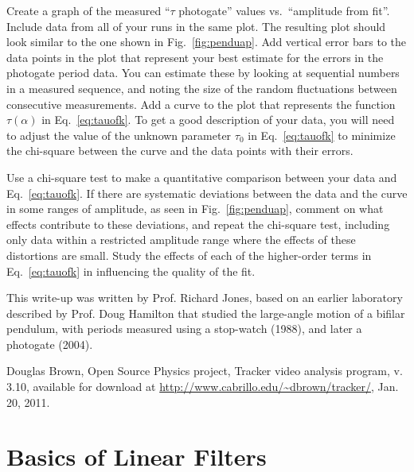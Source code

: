 \documentclass{revtex4}
\begin{document}
Create a graph of the measured ``$\tau$ photogate'' values vs.\ 
``amplitude from fit''.  Include data from all of your runs in the same
plot.  The resulting plot should look similar to the one shown in
Fig.~\ref{fig:penduap}.  Add vertical error bars to the data points in
the plot that represent your best estimate for the errors in the photogate
period data.  You can estimate these by looking at sequential numbers in
a measured sequence, and noting the size of the random fluctuations
between consecutive measurements.  Add a curve to the plot that
represents the function $\tau(\alpha)$ in Eq.~\ref{eq:tauofk}.  To get
a good description of your data, you will need to adjust the value of
the unknown parameter $\tau_0$ in Eq.~\ref{eq:tauofk} to minimize the
chi-square between the curve and the data points with their errors.

Use a chi-square test to make a quantitative comparison between your data
and Eq.~\ref{eq:tauofk}.  If there are systematic deviations between the
data and the curve in some ranges of amplitude, as seen in 
Fig.~\ref{fig:penduap}, comment on what effects contribute to these
deviations, and repeat the chi-square test, including only data within
a restricted amplitude range where the effects of these distortions
are small.  Study the effects of each of the higher-order terms in 
Eq.~\ref{eq:tauofk} in influencing the quality of the fit.

\begin{acknowledgments}
This write-up was written by Prof. Richard Jones, based on an earlier
laboratory described by Prof. Doug Hamilton that studied the large-angle
motion of a bifilar pendulum, with periods measured using a stop-watch (1988),
and later a photogate (2004).
\end{acknowledgments}

%

\begin{thebibliography}{9}

Douglas Brown, Open Source Physics project, Tracker video analysis
program, v. 3.10, available for download at
\url{http://www.cabrillo.edu/~dbrown/tracker/}, Jan. 20, 2011.

\end{thebibliography}

\appendix
\section{Basics of Linear Filters}
\label{app:filters}
\setcounter{figure}{0}
\renewcommand*\thefigure{\Alph{section}.\arabic{figure}}
\end{document}
